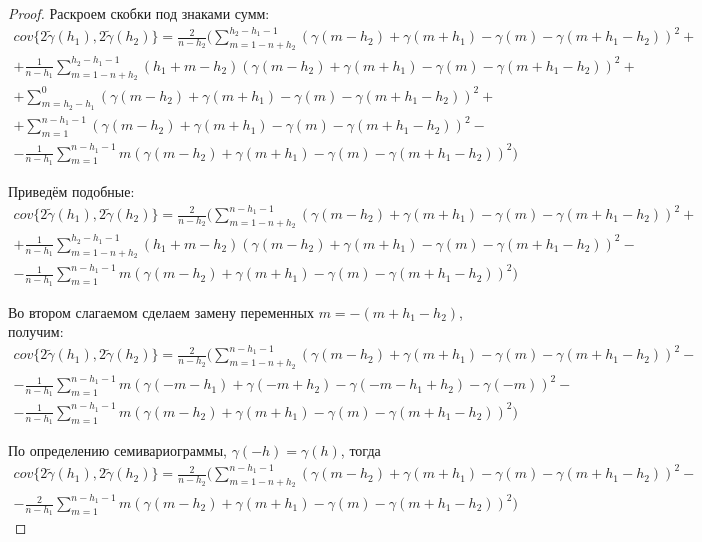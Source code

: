 \begin{proof}
Раскроем скобки под знаками сумм:
\begin{multline*}
	cov\{ 2 \tilde{\gamma}(h_1), 2 \tilde{\gamma}(h_2) \} = \frac{2}{n - h_2} (\sum_{m = 1 - n + h_2}^{h_2 - h_1 - 1} (\gamma(m - h_2) + \gamma(m + h_1) - \gamma(m) - \gamma(m + h_1 - h_2))^2 + \\
	+ \frac{1}{n - h_1} \sum_{m = 1 - n + h_2}^{h_2 - h_1 - 1} (h_1 + m - h_2)(\gamma(m - h_2) + \gamma(m + h_1) - \gamma(m) - \gamma(m + h_1 - h_2))^2 + \\
	+ \sum_{m = h_2 - h_1}^{0}(\gamma(m - h_2) + \gamma(m + h_1) - \gamma(m) - \gamma(m + h_1 - h_2))^2 + \\
	+ \sum_{m = 1}^{n - h_1 - 1}(\gamma(m - h_2) + \gamma(m + h_1) - \gamma(m) - \gamma(m + h_1 - h_2))^2 - \\
	- \frac{1}{n - h_1} \sum_{m = 1}^{n - h_1 - 1} m (\gamma(m - h_2) + \gamma(m + h_1) - \gamma(m) - \gamma(m + h_1 - h_2))^2)
\end{multline*}

Приведём подобные:
\begin{multline*}
	cov\{ 2 \tilde{\gamma}(h_1), 2 \tilde{\gamma}(h_2) \} = \frac{2}{n - h_2} (\sum_{m = 1 - n + h_2}^{n - h_1 - 1} (\gamma(m - h_2) + \gamma(m + h_1) - \gamma(m) - \gamma(m + h_1 - h_2))^2 + \\
	+ \frac{1}{n - h_1} \sum_{m = 1 - n + h_2}^{h_2 - h_1 - 1} (h_1 + m - h_2)(\gamma(m - h_2) + \gamma(m + h_1) - \gamma(m) - \gamma(m + h_1 - h_2))^2 - \\
	- \frac{1}{n - h_1} \sum_{m = 1}^{n - h_1 - 1} m (\gamma(m - h_2) + \gamma(m + h_1) - \gamma(m) - \gamma(m + h_1 - h_2))^2)
\end{multline*}

Во втором слагаемом сделаем замену переменных $ m = -(m + h_1 - h_2) $, получим:
\begin{multline*}
	cov\{ 2 \tilde{\gamma}(h_1), 2 \tilde{\gamma}(h_2) \} = \frac{2}{n - h_2} (\sum_{m = 1 - n + h_2}^{n - h_1 - 1} (\gamma(m - h_2) + \gamma(m + h_1) - \gamma(m) - \gamma(m + h_1 - h_2))^2 - \\
	- \frac{1}{n - h_1} \sum_{m = 1}^{n - h_1 - 1} m (\gamma(-m - h_1) + \gamma(-m + h_2) - \gamma(-m - h_1 + h_2) - \gamma(-m))^2 - \\
	- \frac{1}{n - h_1} \sum_{m = 1}^{n - h_1 - 1} m (\gamma(m - h_2) + \gamma(m + h_1) - \gamma(m) - \gamma(m + h_1 - h_2))^2)
\end{multline*}

По определению семивариограммы, $ \gamma(-h) = \gamma(h) $, тогда
\begin{multline}
\label{eq:cov1}
	cov\{ 2 \tilde{\gamma}(h_1), 2 \tilde{\gamma}(h_2) \} = \frac{2}{n - h_2} (\sum_{m = 1 - n + h_2}^{n - h_1 - 1} (\gamma(m - h_2) + \gamma(m + h_1) - \gamma(m) - \gamma(m + h_1 - h_2))^2 - \\
	- \frac{2}{n - h_1} \sum_{m = 1}^{n - h_1 - 1} m (\gamma(m - h_2) + \gamma(m + h_1) - \gamma(m) - \gamma(m + h_1 - h_2))^2)
\end{multline}


\end{proof}
